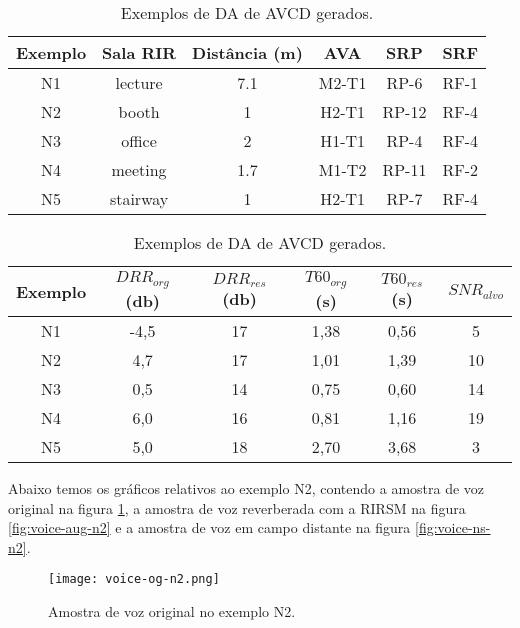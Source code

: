 \begin{table} [H]
    \centering
    \caption{Exemplos de DA de AVCD gerados.}
    \label{tbl:da-noise}
    \begin{tabular}{c|c|c|c|c|c}

        \textbf{Exemplo} & 
        \textbf{Sala RIR} & 
        \textbf{Distância (m)} &
        \textbf{AVA} &
        \textbf{SRP} &
        \textbf{SRF} \\
        \hline 

        N1 & lecture & 7.1 & M2-T1 & RP-6 & RF-1 \\
        N2 & booth & 1 & H2-T1 & RP-12 & RF-4 \\
        N3 & office & 2 & H1-T1 & RP-4 & RF-4 \\
        N4 & meeting & 1.7 & M1-T2 & RP-11 & RF-2 \\
        N5 & stairway & 1 & H2-T1 & RP-7 & RF-4 \\

    \end{tabular}
    \bigbreak
    \bigbreak
    \begin{tabular}{c|c|c|c|c|c}

        \textbf{Exemplo} & 
        \textbf{$DRR_{org}$ (db)} & 
        \textbf{$DRR_{res}$ (db)} & 
        \textbf{$T60_{org}$ (s)} & 
        \textbf{$T60_{res}$ (s)} &
        \textbf{$SNR_{alvo}$} \\
        \hline 

        N1 & -4,5 & 17 & 1,38 & 0,56 & 5 \\
        N2 & 4,7 & 17 & 1,01 & 1,39 & 10 \\
        N3 & 0,5 & 14 & 0,75 & 0,60 & 14 \\
        N4 & 6,0 & 16 & 0,81 & 1,16 & 19 \\
        N5 & 5,0 & 18 & 2,70 & 3,68 & 3 \\

    \end{tabular}
\end{table}

Abaixo temos os gráficos relativos ao exemplo N2, contendo a amostra de voz original na figura \ref{fig:voice-og-n2}, a amostra de voz reverberada
com a RIRSM na figura \ref{fig:voice-aug-n2} e a amostra de voz em campo distante na figura \ref{fig:voice-ns-n2}.

\begin{figure} [H]
    \centering
    \texttt{[image: voice-og-n2.png]}
    \caption{Amostra de voz original no exemplo N2.}
    \label{fig:voice-og-n2}
\end{figure} 

